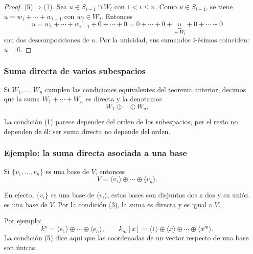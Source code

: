 \begin{frame}[allowframebreaks, t]
\begin{proof}
        \framebreak

        \alert{(5)$\Rightarrow$(1).} Sea $u\in S_{i-1}\cap W_i$ con $1<i\leq n$.
        Como $u\in S_{i-1}$, se tiene $u=w_1+\cdots+w_{i-1}$ con
        $w_j\in W_j$. Entonces
        \[
            u=w_1+\cdots+w_{i-1}+0+\cdots+0
            =0+\cdots+0+\underbrace{u}_{\in W_i}+0+\cdots+0
        \]
        son dos descomposiciones de $u$. Por la unicidad, sus sumandos
        $i$-ésimos coinciden: $u=0$.
    \end{proof}
\end{frame}

\begin{frame}
    \frametitle{Suma directa de varios subespacios}

    \begin{definition}
        Si $W_1,\ldots,W_n$ cumplen las condiciones equivalentes del
        teorema anterior, decimos que la suma $W_1+\cdots+W_n$ es
        \alert{directa} y la denotamos
        \[
            W_1\oplus\cdots\oplus W_n.
        \]
    \end{definition}

    La condición (1) parece depender del orden de los subespacios, per el resto no dependen de él: ser suma directa no depende del orden.
\end{frame}


\begin{frame}
    \frametitle{Ejemplo: la suma directa asociada a una base}

    \begin{example}
        Si $\{v_1,\ldots,v_n\}$ es una base de $V$, entonces
        \[
            V=\langle v_1\rangle\oplus\cdots\oplus\langle v_n\rangle.
        \]
    \end{example}

    En efecto, $\{v_i\}$ es una base de $\langle v_i\rangle$, estas bases
    son disjuntas dos a dos y su unión es una base de $V$. Por la
    condición (3), la suma es directa y es igual a $V$.

    \medskip

    Por ejemplo:
    \[
        k^n=\langle e_1\rangle\oplus\cdots\oplus\langle e_n\rangle,
        \qquad
        k_m[x]=\langle 1\rangle\oplus\langle x\rangle\oplus\cdots
        \oplus\langle x^m\rangle.
    \]
    La condición (5) dice aquí que las coordenadas de un vector respecto
    de una base son únicas.
\end{frame}


